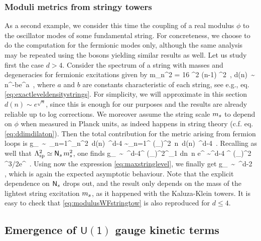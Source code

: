 \subsubsection*{Moduli metrics from stringy towers}
As a second example, we consider this time the coupling of a real modulus $\phi$ to the oscillator modes of some fundamental string. For concreteness, we choose to do the computation for the fermionic modes only, although the same analysis may be repeated using the bosons yielding similar results as well. Let us study first the case $d>4$. Consider the spectrum of a string with masses and degeneracies for fermionic excitations given by
%
\beq
	m_n^2 = 16 \pi^2 (n-1) \Ms^2\, , \qquad  d(n)\, \sim\,  n^{-b}e^{a}\, ,
\eeq
%
where $a$ and $b$ are constants characteristic of each string, see e.g., eq. \eqref{eq:exactleveldensitystrings}. For simplicity, we will approximate in this section $d(n) \sim e^{\sqrt{n}}$, since this is enough for our purposes and the results are already reliable up to log corrections. We moreover assume the string scale $m_s$ to depend on $\phi$ when measured in Planck units, as indeed happens in string theory (c.f. eq. \eqref{eq:ddimdilaton}). Then the total contribution for the metric arising from fermion loops is 
%
\beq
	\delta g_{\phi \phi}\, \sim\, \sum_{n=1}^{\Ns}\mu_n^2\, d(n)\, \LSP^{d-4} \sim \sum_{n=1}^{\Ns} (\partial_\phi \Ms)^2\, n\, d(n)\, \LSP^{d-4}\, .
\eeq
%
Recalling as well that $\Lambda_{\text{sp}} ^2 \simeq \mathsf{N}_s\, m_s^2$, one finds
%
\beq
	\delta g_{\phi \phi}\, \sim\, \Ms^{d-4}\Ns^{} (\partial_\phi \Ms)^2\int^{\Ns}_1 dn\, n\;  e^{} \sim  \Ms^{d-4} \Ns^{} (\partial_\phi \Ms)^2  \Ns^{3/2}e^{\sqrt{\Ns}}\, .
\eeq
%
Using now the expression \eqref{eq:maxstringlevel}, we finally get
%
\beq\label{eq:modulusWFstringtow}
	\delta g_{\phi \phi}\, \sim\, \Mpd^{d-2}\, ,
\eeq
%
which is again the expected asymptotic behaviour. Note that the explicit dependence on $\mathsf{N}_s$ drops out, and the result only depends on the mass of the lightest string excitation $m_s$, as it happened with the Kaluza-Klein towers. It is easy to check that \eqref{eq:modulusWFstringtow} is also reproduced for $d\leq 4$. %

 \subsection{Emergence of $\mathsf{U(1)}$ gauge kinetic terms}\label{ss:EmergenceU(1)gauge}
	

